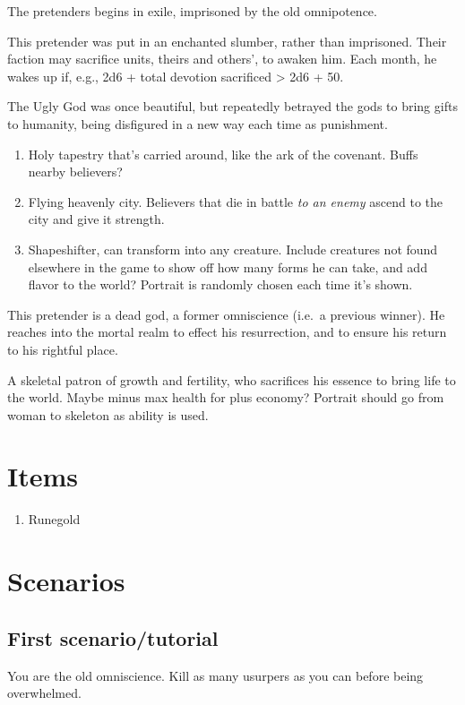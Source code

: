 \documentclass[12pt,letterpaper]{article}
\begin{document}
The pretenders begins in exile,
imprisoned by the old omnipotence.

This pretender was put in an enchanted slumber,
rather than imprisoned.
Their faction may sacrifice units, theirs and others', to awaken him.
Each month, he wakes up if, e.g., 2d6 + total devotion sacrificed > 2d6 + 50.

The Ugly God  was once beautiful,
but repeatedly betrayed the gods to bring gifts to humanity,
being disfigured in a new way each time as punishment.

\begin{enumerate}
	\item Holy tapestry that's carried around,
	      like the ark of the covenant.
	      Buffs nearby believers?
	\item Flying heavenly city.
	      Believers that die in battle \emph{to an enemy}
	      ascend to the city and give it strength.
	\item Shapeshifter, can transform into any creature.
	      Include creatures not found elsewhere in the game
	      to show off how many forms he can take, and add flavor to the world?
	      Portrait is randomly chosen each time it's shown.
\end{enumerate}

This pretender is a dead god, a former omniscience (i.e.\ a previous winner).
He reaches into the mortal realm to effect his resurrection,
and to ensure his return to his rightful place.

A skeletal patron of growth and fertility,
who sacrifices his essence to bring life to the world.
Maybe minus max health for plus economy?
Portrait should go from woman to skeleton as ability is used.

\section{Items}

\begin{enumerate}
	\item Runegold
\end{enumerate}

\clearpage

\section{Scenarios}

\subsection{First scenario/tutorial}
You are the old omniscience.
Kill as many usurpers as you can before being overwhelmed.
\end{document}
